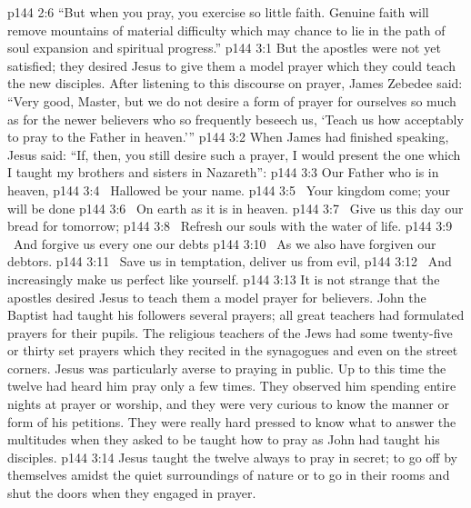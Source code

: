 \vs p144 2:6 \textcolor{ubdarkred}{“But when you pray, you exercise so little faith. Genuine faith will remove mountains of material difficulty which may chance to lie in the path of soul expansion and spiritual progress.”}
\vs p144 3:1 But the apostles were not yet satisfied; they desired Jesus to give them a model prayer which they could teach the new disciples. After listening to this discourse on prayer, James Zebedee said: “Very good, Master, but we do not desire a form of prayer for ourselves so much as for the newer believers who so frequently beseech us, ‘Teach us how acceptably to pray to the Father in heaven.’”
\vs p144 3:2 When James had finished speaking, Jesus said: \textcolor{ubdarkred}{“If, then, you still desire such a prayer, I would present the one which I taught my brothers and sisters in Nazareth”:}
\vsetoff
\vs p144 3:3 \textcolor{ubdarkred}{Our Father who is in heaven,}
\vs p144 3:4 \hsetoff \textcolor{ubdarkred}{ Hallowed be your name.}
\vs p144 3:5 \textcolor{ubdarkred}{ Your kingdom come; your will be done}
\vs p144 3:6 \hsetoff \textcolor{ubdarkred}{ On earth as it is in heaven.}
\vs p144 3:7 \textcolor{ubdarkred}{ Give us this day our bread for tomorrow;}
\vs p144 3:8 \hsetoff \textcolor{ubdarkred}{ Refresh our souls with the water of life.}
\vs p144 3:9 \textcolor{ubdarkred}{ And forgive us every one our debts}
\vs p144 3:10 \hsetoff \textcolor{ubdarkred}{ As we also have forgiven our debtors.}
\vs p144 3:11 \textcolor{ubdarkred}{ Save us in temptation, deliver us from evil,}
\vs p144 3:12 \hsetoff \textcolor{ubdarkred}{ And increasingly make us perfect like yourself.}
\vsetoff
\vs p144 3:13 \pc It is not strange that the apostles desired Jesus to teach them a model prayer for believers. John the Baptist had taught his followers several prayers; all great teachers had formulated prayers for their pupils. The religious teachers of the Jews had some twenty\hyp{}five or thirty set prayers which they recited in the synagogues and even on the street corners. Jesus was particularly averse to praying in public. Up to this time the twelve had heard him pray only a few times. They observed him spending entire nights at prayer or worship, and they were very curious to know the manner or form of his petitions. They were really hard pressed to know what to answer the multitudes when they asked to be taught how to pray as John had taught his disciples.
\vs p144 3:14 Jesus taught the twelve always to pray in secret; to go off by themselves amidst the quiet surroundings of nature or to go in their rooms and shut the doors when they engaged in prayer.
